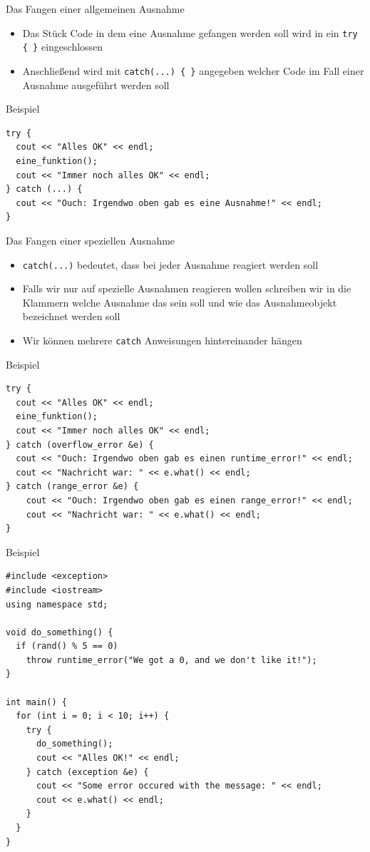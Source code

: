 \documentclass[presentation]{beamer}
\begin{document}
\begin{frame}[label={sec:org57c8ac0},fragile]{Das Fangen einer allgemeinen Ausnahme}
 \begin{itemize}
\item Das Stück Code in dem eine Ausnahme gefangen werden soll wird in ein
{\color{solarizedYellow}\texttt{try \{ \}} }eingeschlossen
\item Anschließend wird mit {\color{solarizedYellow}\texttt{catch(...) \{ \}} }angegeben \alert{welcher Code} im
Fall einer Ausnahme ausgeführt werden soll
\end{itemize}
\begin{block}{Beispiel}
\begin{verbatim}
try {
  cout << "Alles OK" << endl;
  eine_funktion();
  cout << "Immer noch alles OK" << endl;
} catch (...) {
  cout << "Ouch: Irgendwo oben gab es eine Ausnahme!" << endl;
}
\end{verbatim}
\end{block}
\end{frame}
\begin{frame}[label={sec:org3aef413},fragile]{Das Fangen einer speziellen Ausnahme}
 \begin{itemize}
\item {\color{solarizedYellow}\texttt{catch(...)} }bedeutet, dass bei \alert{jeder Ausnahme} reagiert werden
soll
\item Falls wir nur auf \alert{spezielle Ausnahmen} reagieren wollen schreiben
wir in die Klammern \alert{welche Ausnahme} das sein soll und wie das
Ausnahmeobjekt bezeichnet werden soll
\item Wir können mehrere {\color{solarizedYellow}\texttt{catch} }Anweisungen hintereinander hängen
\end{itemize}
\begin{block}{Beispiel}
\begin{verbatim}
try {
  cout << "Alles OK" << endl;
  eine_funktion();
  cout << "Immer noch alles OK" << endl;
} catch (overflow_error &e) {
  cout << "Ouch: Irgendwo oben gab es einen runtime_error!" << endl;
  cout << "Nachricht war: " << e.what() << endl;
} catch (range_error &e) {
    cout << "Ouch: Irgendwo oben gab es einen range_error!" << endl;
    cout << "Nachricht war: " << e.what() << endl;
}
\end{verbatim}
\end{block}
\end{frame}
\begin{frame}[label={sec:orgd1a55b6},fragile]{Beispiel}
 \begin{verbatim}
#include <exception>
#include <iostream>
using namespace std;

void do_something() {
  if (rand() % 5 == 0)
    throw runtime_error("We got a 0, and we don't like it!");
}

int main() {
  for (int i = 0; i < 10; i++) {
    try {
      do_something();
      cout << "Alles OK!" << endl;
    } catch (exception &e) {
      cout << "Some error occured with the message: " << endl;
      cout << e.what() << endl;
    }
  }
}
\end{verbatim}
\end{frame}
\end{document}
